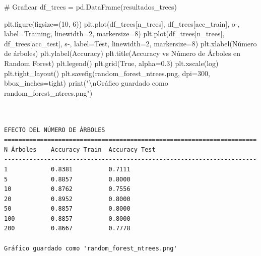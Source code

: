 \documentclass[
  doc,
  floatsintext,
  longtable,
  a4paper,
  nolmodern,
  notxfonts,
  notimes,
  12pt,
  colorlinks=true,linkcolor=blue,citecolor=blue,urlcolor=blue]{apa7}
\newenvironment{Shaded}{\begin{snugshade}}{\end{snugshade}}
\newcommand{\BuiltInTok}[1]{\textcolor[rgb]{0.00,0.23,0.31}{#1}}
\newcommand{\CharTok}[1]{\textcolor[rgb]{0.13,0.47,0.30}{#1}}
\newcommand{\CommentTok}[1]{\textcolor[rgb]{0.37,0.37,0.37}{#1}}
\newcommand{\DecValTok}[1]{\textcolor[rgb]{0.68,0.00,0.00}{#1}}
\newcommand{\FloatTok}[1]{\textcolor[rgb]{0.68,0.00,0.00}{#1}}
\newcommand{\NormalTok}[1]{\textcolor[rgb]{0.00,0.23,0.31}{#1}}
\newcommand{\OperatorTok}[1]{\textcolor[rgb]{0.37,0.37,0.37}{#1}}
\newcommand{\StringTok}[1]{\textcolor[rgb]{0.13,0.47,0.30}{#1}}
\newcommand{\VariableTok}[1]{\textcolor[rgb]{0.07,0.07,0.07}{#1}}
\begin{document}
\begin{Shaded}
\begin{Highlighting}[]
\CommentTok{\# Graficar}
\NormalTok{df\_trees }\OperatorTok{=}\NormalTok{ pd.DataFrame(resultados\_trees)}

\NormalTok{plt.figure(figsize}\OperatorTok{=}\NormalTok{(}\DecValTok{10}\NormalTok{, }\DecValTok{6}\NormalTok{))}
\NormalTok{plt.plot(df\_trees[}\StringTok{\textquotesingle{}n\_trees\textquotesingle{}}\NormalTok{], df\_trees[}\StringTok{\textquotesingle{}acc\_train\textquotesingle{}}\NormalTok{], }
         \StringTok{\textquotesingle{}o{-}\textquotesingle{}}\NormalTok{, label}\OperatorTok{=}\StringTok{\textquotesingle{}Training\textquotesingle{}}\NormalTok{, linewidth}\OperatorTok{=}\DecValTok{2}\NormalTok{, markersize}\OperatorTok{=}\DecValTok{8}\NormalTok{)}
\NormalTok{plt.plot(df\_trees[}\StringTok{\textquotesingle{}n\_trees\textquotesingle{}}\NormalTok{], df\_trees[}\StringTok{\textquotesingle{}acc\_test\textquotesingle{}}\NormalTok{], }
         \StringTok{\textquotesingle{}s{-}\textquotesingle{}}\NormalTok{, label}\OperatorTok{=}\StringTok{\textquotesingle{}Test\textquotesingle{}}\NormalTok{, linewidth}\OperatorTok{=}\DecValTok{2}\NormalTok{, markersize}\OperatorTok{=}\DecValTok{8}\NormalTok{)}
\NormalTok{plt.xlabel(}\StringTok{\textquotesingle{}Número de árboles\textquotesingle{}}\NormalTok{)}
\NormalTok{plt.ylabel(}\StringTok{\textquotesingle{}Accuracy\textquotesingle{}}\NormalTok{)}
\NormalTok{plt.title(}\StringTok{\textquotesingle{}Accuracy vs Número de Árboles en Random Forest\textquotesingle{}}\NormalTok{)}
\NormalTok{plt.legend()}
\NormalTok{plt.grid(}\VariableTok{True}\NormalTok{, alpha}\OperatorTok{=}\FloatTok{0.3}\NormalTok{)}
\NormalTok{plt.xscale(}\StringTok{\textquotesingle{}log\textquotesingle{}}\NormalTok{)}
\NormalTok{plt.tight\_layout()}
\NormalTok{plt.savefig(}\StringTok{\textquotesingle{}random\_forest\_ntrees.png\textquotesingle{}}\NormalTok{, dpi}\OperatorTok{=}\DecValTok{300}\NormalTok{, bbox\_inches}\OperatorTok{=}\StringTok{\textquotesingle{}tight\textquotesingle{}}\NormalTok{)}
\BuiltInTok{print}\NormalTok{(}\StringTok{"}\CharTok{\textbackslash{}n}\StringTok{Gráfico guardado como \textquotesingle{}random\_forest\_ntrees.png\textquotesingle{}"}\NormalTok{)}
\end{Highlighting}
\end{Shaded}

\begin{verbatim}


EFECTO DEL NÚMERO DE ÁRBOLES
======================================================================
N Árboles    Accuracy Train  Accuracy Test  
----------------------------------------------------------------------
1            0.8381          0.7111         
5            0.8857          0.8000         
10           0.8762          0.7556         
20           0.8952          0.8000         
50           0.8857          0.8000         
100          0.8857          0.8000         
200          0.8667          0.7778         

Gráfico guardado como 'random_forest_ntrees.png'
\end{verbatim}
\end{document}
